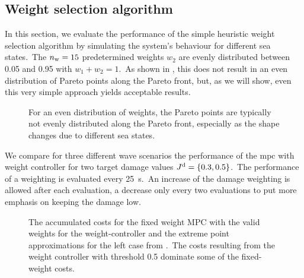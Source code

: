 \subsection{Weight selection algorithm}
In this section, we evaluate the performance of the simple heuristic weight selection algorithm by simulating the system's behaviour for different sea states.\ 
The $n_\mathrm{w}=15$ predetermined weights $w_2$ are evenly distributed between 0.05 and 0.95 with $w_1+w_2=1$.\ 
As shown in , this does not result in an even distribution of Pareto points along the Pareto front, but, as we will show, even this very simple approach yields acceptable results.\
\begin{figure}[htb]
	\centering
	\fontsize{8}{0}\selectfont
	\def\svgwidth{0.4\textwidth}
	
	\caption{For an even distribution of weights, the Pareto points are typically not evenly distributed along the Pareto front, especially as the shape changes due to different sea states.}
	\label{fig:PF}
\end{figure}

We compare for three different wave scenarios the performance of the \ac{mpc} with weight controller for two target damage values $J^\mathrm{d} = \left\{0.3, 0.5\right\}$.\ 
The performance of a weighting is evaluated every \SI{25}{\second}.\ 
An increase of the damage weighting is allowed after each evaluation, a decrease only every two evaluations to put more emphasis on keeping the damage low.

\begin{figure}[tb]
	\centering
	\fontsize{8}{0}\selectfont
	\def\svgwidth{0.49\textwidth}
	
	\caption{The accumulated costs for the fixed weight MPC with the valid weights for the weight-controller and the extreme point approximations for the left case from .\ The costs resulting from the weight controller with threshold 0.5 dominate some of the fixed-weight costs.}
	\label{fig:mpc_pf}
\end{figure}
\begin{figure*}[htb!]
	\centering
	\fontsize{8}{0}\selectfont
	\def\svgwidth{0.97\textwidth}
	
	\caption{Evaluation of the \ac{mpc} with weight controller for three wave scenarios and two target damage values.\ For clarity, only every 100th value is displayed. Top: Accumulated damage over time. Middle: The selected weight index \iw over time. A lower index corresponds to a higher weighting for the damage cost. Bottom: Extracted energy over time. For the lower damage thresholds, the extracted energy reduces only by 0.09, 0.05, and \SI{0.06}{\mega\joule} for the three cases, respectively.}
	\label{fig:weight_control}
\end{figure*}

